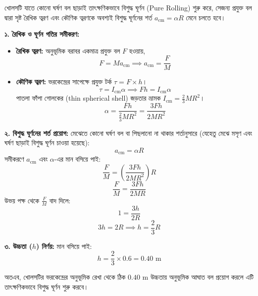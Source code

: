 \documentclass[12pt, a4paper]{article}
\begin{document}
\begin{tcolorbox}[solutionbox={সমাধান (Solution)}]
\noindent
খোলসটি যাতে কোনো ঘর্ষণ বল ছাড়াই তাৎক্ষণিকভাবে বিশুদ্ধ ঘূর্ণন (Pure Rolling) শুরু করে, সেজন্য প্রযুক্ত বল দ্বারা সৃষ্ট রৈখিক ত্বরণ এবং কৌণিক ত্বরণকে অবশ্যই বিশুদ্ধ ঘূর্ণনের শর্ত $a_{\text{cm}} = \alpha R$ মেনে চলতে হবে।

\vspace{0.5em}
\textbf{১. রৈখিক ও ঘূর্ণন গতির সমীকরণ:}
\begin{itemize}[leftmargin=1.5em, itemsep=0.2em]
    \item \textbf{রৈখিক ত্বরণ:} অনুভূমিক বরাবর একমাত্র প্রযুক্ত বল $F$ হওয়ায়,
    $$F = M a_{\text{cm}} \implies a_{\text{cm}} = \frac{F}{M}$$
    
    \item \textbf{কৌণিক ত্বরণ:} ভরকেন্দ্রের সাপেক্ষে প্রযুক্ত টর্ক $\tau = F \times h$।
    $$\tau = I_{\text{cm}} \alpha \implies F h = I_{\text{cm}} \alpha$$
    পাতলা ফাঁপা গোলকের (thin spherical shell) জড়তার ভ্রামক $I_{\text{cm}} = \frac{2}{3} M R^2$।
    $$\alpha = \frac{F h}{\frac{2}{3} M R^2} = \frac{3 F h}{2 M R^2}$$
\end{itemize}

\vspace{0.5em}
\textbf{২. বিশুদ্ধ ঘূর্ণনের শর্ত প্রয়োগ:}
মেঝেতে কোনো ঘর্ষণ বল বা পিছলানো না থাকার শর্তানুসারে (যেহেতু মেঝে মসৃণ এবং ঘর্ষণ ছাড়াই বিশুদ্ধ ঘূর্ণন চাওয়া হয়েছে):
$$a_{\text{cm}} = \alpha R$$
সমীকরণে $a_{\text{cm}}$ এবং $\alpha$-এর মান বসিয়ে পাই:
$$\frac{F}{M} = \left(\frac{3 F h}{2 M R^2}\right) R$$
$$\frac{F}{M} = \frac{3 F h}{2 M R}$$
উভয় পক্ষ থেকে $\frac{F}{M}$ বাদ দিলে:
$$1 = \frac{3 h}{2 R}$$
$$3h = 2R \implies h = \frac{2}{3} R$$

\vspace{0.5em}
\textbf{৩. উচ্চতা ($h$) নির্ণয়:}
মান বসিয়ে পাই:
$$h = \frac{2}{3} \times 0.6 = 0.40\text{ m}$$

অতএব, খোলসটির ভরকেন্দ্রের অনুভূমিক রেখা থেকে ঠিক $0.40\text{ m}$ উচ্চতায় অনুভূমিক আঘাত বল প্রয়োগ করলে এটি তাৎক্ষণিকভাবে বিশুদ্ধ ঘূর্ণন শুরু করবে।
\end{tcolorbox}
\vspace{1em}
\end{document}

